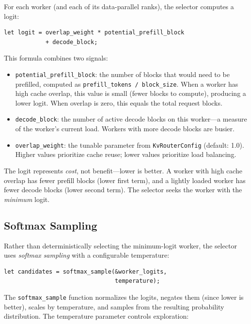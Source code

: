 For each worker (and each of its data-parallel ranks), the selector computes a logit:

\begin{verbatim}
let logit = overlap_weight * potential_prefill_block
            + decode_block;
\end{verbatim}

This formula combines two signals:

\begin{itemize}
  \item \texttt{potential\_prefill\_block}: the number of blocks that would need to be prefilled, computed as \texttt{prefill\_tokens / block\_size}. When a worker has high cache overlap, this value is small (fewer blocks to compute), producing a lower logit. When overlap is zero, this equals the total request blocks.
  \item \texttt{decode\_block}: the number of active decode blocks on this worker---a measure of the worker's current load. Workers with more decode blocks are busier.
  \item \texttt{overlap\_weight}: the tunable parameter from \texttt{KvRouterConfig} (default: 1.0). Higher values prioritize cache reuse; lower values prioritize load balancing.
\end{itemize}

\begin{notebox}
The logit represents \emph{cost}, not benefit---lower is better. A worker with high cache overlap has fewer prefill blocks (lower first term), and a lightly loaded worker has fewer decode blocks (lower second term). The selector seeks the worker with the \emph{minimum} logit.
\end{notebox}

\subsection{Softmax Sampling}

Rather than deterministically selecting the minimum-logit worker, the selector uses \emph{softmax sampling} with a configurable temperature:

\begin{verbatim}
let candidates = softmax_sample(&worker_logits,
                                temperature);
\end{verbatim}

The \texttt{softmax\_sample} function normalizes the logits, negates them (since lower is better), scales by temperature, and samples from the resulting probability distribution. The temperature parameter controls exploration:

